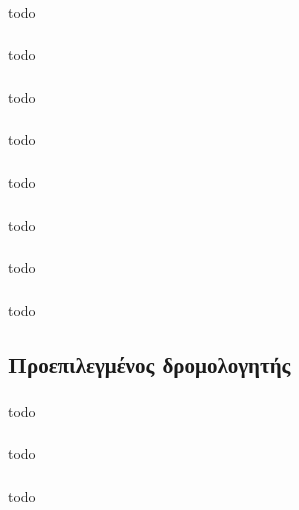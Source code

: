 \documentclass[a4paper, 12pt]{article}
\begin{document}
		\subsubsection{}
			todo

		\subsubsection{}
			todo

		\subsubsection{}
			todo

		\subsubsection{}
			todo

		\subsubsection{}
			todo

		\subsubsection{}
			todo

		\subsubsection{}
			todo

		\subsubsection{}
			todo

	\subsection{Προεπιλεγμένος δρομολογητής}

		\subsubsection{}
			todo

		\subsubsection{}
			todo

		\subsubsection{}
			todo
\end{document}
